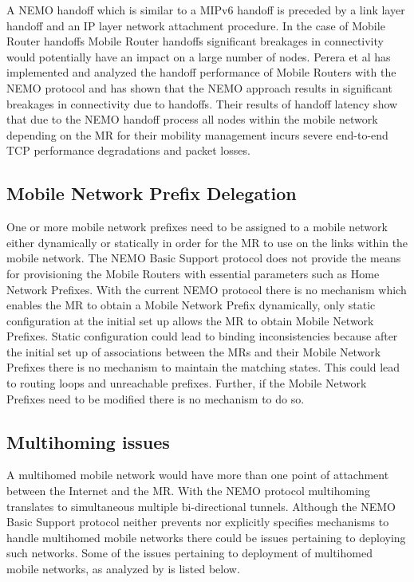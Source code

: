 A NEMO handoff which is similar to a MIPv6 handoff is preceded by a link layer
handoff and an IP layer network attachment procedure. In the case of Mobile Router handoffs  Mobile Router handoffs  significant breakages in connectivity would potentially have an impact on a large number of nodes. Perera et al \cite{15} has implemented and analyzed the
handoff performance of Mobile Routers with the NEMO protocol and has shown
that the NEMO approach results in significant breakages in connectivity due to
handoffs. Their results of handoff latency \cite{16} show that due
to the NEMO handoff process all nodes within the
mobile network depending on the MR for their mobility management
incurs severe end-to-end TCP performance degradations and packet losses.

\subsection{Mobile Network Prefix Delegation}

One or more mobile network prefixes need to be assigned to a mobile network
either dynamically or statically in order for the MR to use on the links
within the mobile network. The NEMO Basic Support protocol does not provide
the means for provisioning the Mobile Routers with essential parameters such
as Home Network Prefixes. With the current NEMO protocol there is no
mechanism which enables the MR to obtain a Mobile Network Prefix
dynamically, only static configuration at the initial set up allows the MR to
obtain Mobile Network Prefixes. Static configuration could lead to binding
inconsistencies because after the initial set up of associations between the
MRs and their Mobile Network Prefixes there is no mechanism to maintain the
matching states. This could lead to routing loops and unreachable prefixes.
Further, if the Mobile Network Prefixes need to be modified there is no
mechanism to do so.

\subsection{Multihoming issues}

A multihomed mobile network would have more than one point of attachment
between the Internet and the MR. With the NEMO protocol
multihoming translates to simultaneous multiple bi-directional tunnels.
Although the NEMO Basic Support protocol neither prevents nor explicitly
specifies mechanisms to handle multihomed mobile networks there could be
issues pertaining to deploying such networks. Some of the issues pertaining to
deployment of multihomed mobile networks, as analyzed by \cite{17} is listed below.

